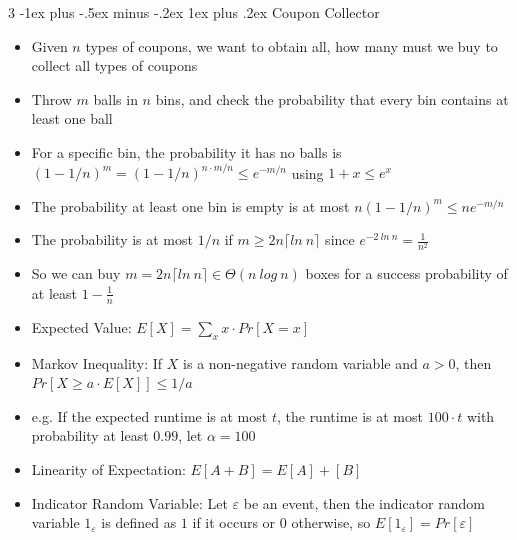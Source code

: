 \documentclass[10pt, landscape]{article}
\makeatletter
\renewcommand{\subsection}{\@startsection{subsection}{3}{0mm}%
                                {-1ex plus -.5ex minus -.2ex}%
                                {1ex plus .2ex}%
                                {\normalfont\small\bfseries}}%
\makeatother
\begin{document}
\begin{multicols*}{3}
\subsection{Coupon Collector}
\begin{itemize}
    \item Given $n$ types of coupons, we want to obtain all, how many must we buy to collect all types of coupons
    \item Throw $m$ balls in $n$ bins, and check the probability that every bin contains at least one ball
    \item For a specific bin, the probability it has no balls is $(1-1/n)^m=(1-1/n)^{n\cdot m/n}\leq e^{-m/n}$ using $1+x \leq e^x$
    \item The probability at least one bin is empty is at most $n(1-1/n)^m \leq ne^{-m/n}$
    \item The probability is at most $1/n$ if $m \geq 2n\lceil ln\ n\rceil$ since $e^{-2\ ln\ n}=\frac{1}{n^2}$
    \item So we can buy $m=2n\lceil ln\ n\rceil \in \Theta(n\ log\ n)$ boxes for a success probability of at least $1-\frac{1}{n}$
    \item Expected Value: $E[X]=\sum_x x \cdot Pr[X=x]$
    \item Markov Inequality: If $X$ is a non-negative random variable and $a>0$, then $Pr[X \geq a \cdot E[X]] \leq 1/a$
    \item e.g. If the expected runtime is at most $t$, the runtime is at most $100 \cdot t$ with probability at least $0.99$, let $\alpha=100$
    \item Linearity of Expectation: $E[A+B]=E[A]+[B]$
    \item Indicator Random Variable: Let $\varepsilon$ be an event, then the indicator random variable $1_\varepsilon$ is defined as $1$ if it occurs or $0$ otherwise, so $E[1_\varepsilon]=Pr[\varepsilon]$
\end{itemize}


\end{multicols*}
\end{document}
